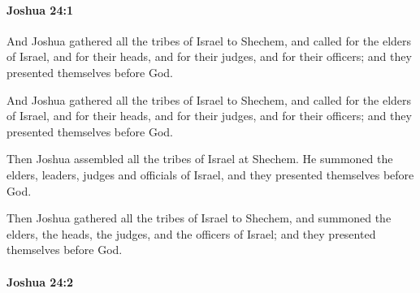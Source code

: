 		\paragraph{Joshua 24:1} %
			\label{JOSHUA-24-1}

			And Joshua gathered all the tribes of Israel to Shechem, and called for the elders of Israel, and for their heads, and for their judges, and for their officers; and they presented themselves before God.

			\begin{versebox}
					\item[BHS] 
					\item[ASV] And Joshua gathered all the tribes of Israel to Shechem, and called for the elders of Israel, and for their heads, and for their judges, and for their officers; and they presented themselves before God.
					\item[NIV] Then Joshua assembled all the tribes of Israel at Shechem. He summoned the elders, leaders, judges and officials of Israel, and they presented themselves before God.
					\item[NRSV] Then Joshua gathered all the tribes of Israel to Shechem, and summoned the elders, the heads, the judges, and the officers of Israel; and they presented themselves before God.
			\end{versebox}

		\paragraph{Joshua 24:2} %
			\label{JOSHUA-24-2}

